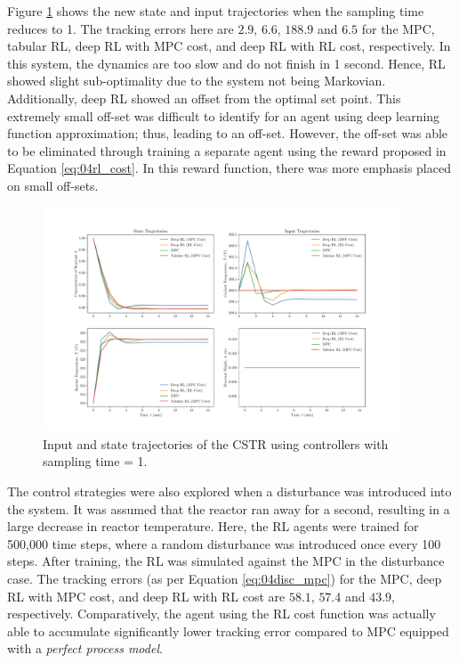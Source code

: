 Figure \ref{fig:04CSTR_1} shows the new state and input trajectories when the sampling time reduces to 1. The tracking errors here are $2.9$, $6.6$, $188.9$ and $6.5$ for the MPC, tabular RL, deep RL with MPC cost, and deep RL with RL cost, respectively. In this system, the dynamics are too slow and do not finish in 1 second.  Hence, RL showed slight sub-optimality due to the system not being Markovian.  Additionally, deep RL showed an offset from the optimal set point.  This extremely small off-set was difficult to identify for an agent using deep learning function approximation; thus, leading to an off-set.  However, the off-set was able to be eliminated through training a separate agent using the reward proposed in Equation \ref{eq:04rl_cost}.  In this reward function, there was more emphasis placed on small off-sets.
\begin{figure}[H]
    \centering
    \includegraphics[width=0.95\textwidth]{images/ch4/States_and_Inputs_1_CSTR.pdf}
    \caption{Input and state trajectories of the CSTR using controllers with sampling time = 1.}
    \label{fig:04CSTR_1}
\end{figure}

The control strategies were also explored when a disturbance was introduced into the system. It was assumed that the reactor ran away for a second, resulting in a large decrease in reactor temperature. Here, the RL agents were trained for 500,000 time steps, where a random disturbance was introduced once every 100 steps.  After training, the RL was simulated against the MPC in the disturbance case. The tracking errors (as per Equation \ref{eq:04disc_mpc}) for the MPC, deep RL with MPC cost, and deep RL with RL cost are $58.1$, $57.4$ and $43.9$, respectively. Comparatively, the agent using the RL cost function was actually able to accumulate significantly lower tracking error compared to MPC equipped with a \textit{perfect process model}. 

